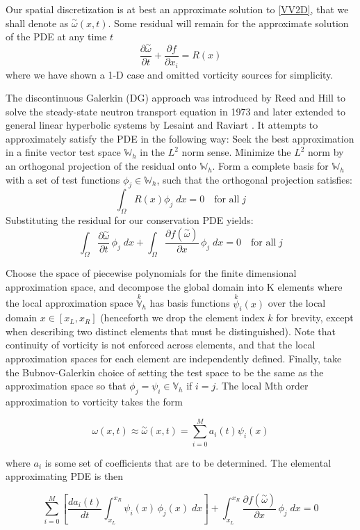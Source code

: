 \documentclass[letterpaper,12pt]{report}
\newcommand{\be}{\begin{equation}}
\newcommand{\ben}[1]{\begin{equation}\label{#1}}
\newcommand{\ee}{\end{equation}}
\newcommand{\aomega}{\overset{\sim}{\omega}}				%
\begin{document}
Our spatial discretization is at best an approximate solution to \eqref{VV2D}, that we shall denote as $\aomega(x,t)$. Some residual will remain for the approximate solution of the PDE at any time $t$
\ben{VV2D} \frac{\partial \aomega}{\partial t} + \frac{\partial f}{\partial x_i} = R(x)\ee
where we have shown a 1-D case and omitted vorticity sources for simplicity.

The discontinuous Galerkin (DG) approach was introduced by Reed and Hill to solve the steady-state neutron transport equation in 1973 \cite{ReedHill} and later extended to general linear hyperbolic systems by Lesaint and Raviart \cite{Lesaint}. It attempts to approximately satisfy the PDE in the following way: Seek the best approximation in a finite vector test space $\mathbb{W}_h$  in the $L^2$ norm sense. Minimize the $L^2$ norm by an orthogonal projection of the residual onto $\mathbb{W}_h$. Form a complete basis for $\mathbb{W}_h$ with a set of test functions $\phi_j \in \mathbb{W}_h$, such that the orthogonal projection satisfies:
\be \int_\Omega R(x) \phi_j \;dx = 0 \quad\mbox{for all}\; j\ee
Substituting the residual for our conservation PDE yields:
\be \int_\Omega \frac{\partial \aomega}{\partial t} \, \phi_j \;dx + \int_\Omega \frac{\partial f(\aomega)}{\partial x} \, \phi_j \;dx = 0 \quad\mbox{for all}\; j\ee

Choose the space of piecewise polynomials for the finite dimensional approximation space, and decompose the global domain into K elements where the local approximation space $\overset{k}{\mathbb{V}}_h$ has basis functions $\overset{k}{\psi}_i(x)$ over the local domain $x \in [x_L, x_R]$ (henceforth we drop the element index $k$ for brevity, except when describing two distinct elements that must be distinguished). Note that continuity of vorticity is not enforced across elements, and that the local approximation spaces for each element are independently defined. Finally, take the Bubnov-Galerkin choice of setting the test space to be the same as the approximation space so that $\phi_j=\psi_i \in \mathbb{V}_h$ if $i=j$. The local Mth order approximation to vorticity takes the form

\be \omega(x,t) \approx \aomega(x,t) = \sum_{i=0}^M a_i(t)\psi_i(x)\ee

where $a_i$ is some set of coefficients that are to be determined. The elemental approximating PDE is then

\be \sum_{i=0}^M \left[ \frac{d a_i(t)}{dt}\int_{x_L}^{x_R}\psi_i(x)  \, \phi_j(x) \;dx \right]
+ \int_{x_L}^{x_R} \frac{\partial f(\aomega)}{\partial x} \, \phi_j \;dx = 0 \ee
\end{document}
